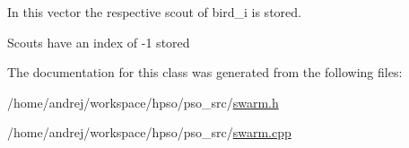 In this vector the respective scout of bird\_\-i is stored. 

Scouts have an index of -1 stored 

The documentation for this class was generated from the following files:\begin{CompactItemize}
\item 
/home/andrej/workspace/hpso/pso\_\-src/\hyperlink{swarm_8h}{swarm.h}\item 
/home/andrej/workspace/hpso/pso\_\-src/\hyperlink{swarm_8cpp}{swarm.cpp}\end{CompactItemize}
